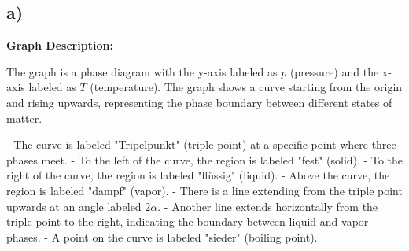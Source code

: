 

\subsection*{a)}

\textbf{Graph Description:}

The graph is a phase diagram with the y-axis labeled as $p$ (pressure) and the x-axis labeled as $T$ (temperature). The graph shows a curve starting from the origin and rising upwards, representing the phase boundary between different states of matter. 

- The curve is labeled "Tripelpunkt" (triple point) at a specific point where three phases meet.
- To the left of the curve, the region is labeled "fest" (solid).
- To the right of the curve, the region is labeled "flüssig" (liquid).
- Above the curve, the region is labeled "dampf" (vapor).
- There is a line extending from the triple point upwards at an angle labeled $2\alpha$.
- Another line extends horizontally from the triple point to the right, indicating the boundary between liquid and vapor phases.
- A point on the curve is labeled "sieder" (boiling point).